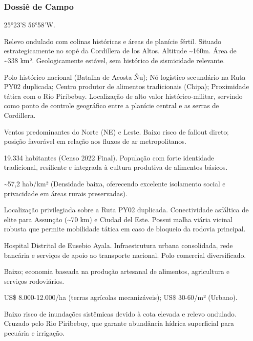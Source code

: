 \subsubsection{Dossiê de Campo}
\begin{description}[style=nextline,leftmargin=0.5cm,font=\bfseries]
\item[Coordenadas]  25°23'S 56°58'W.
\item[Topografia]  Relevo ondulado com colinas históricas e áreas de planície fértil. Situado estrategicamente no sopé da Cordillera de los Altos. Altitude \textasciitilde 160m. Área de \textasciitilde 338 km². Geologicamente estável, sem histórico de sismicidade relevante.
\item[Alvos Estratégicos]  Polo histórico nacional (Batalha de Acosta Ñu); Nó logístico secundário na Ruta PY02 duplicada; Centro produtor de alimentos tradicionais (Chipa); Proximidade tática com o Rio Piribebuy. Localização de alto valor histórico-militar, servindo como ponto de controle geográfico entre a planície central e as serras de Cordillera.
\item[Fallout]  Ventos predominantes do Norte (NE) e Leste. Baixo risco de fallout direto; posição favorável em relação aos fluxos de ar metropolitanos.
\item[População]  19.334 habitantes (Censo 2022 Final). População com forte identidade tradicional, resiliente e integrada à cultura produtiva de alimentos básicos.
\item[Densidade]  \textasciitilde 57,2 hab/\allowbreak km² (Densidade baixa, oferecendo excelente isolamento social e privacidade em áreas rurais preservadas).
\item[Vias de Acesso]  Localização privilegiada sobre a Ruta PY02 duplicada. Conectividade asfáltica de elite para Assunção (\textasciitilde 70 km) e Ciudad del Este. Possui malha viária vicinal robusta que permite mobilidade tática em caso de bloqueio da rodovia principal.
\item[Serviços]  Hospital Distrital de Eusebio Ayala. Infraestrutura urbana consolidada, rede bancária e serviços de apoio ao transporte nacional. Polo comercial diversificado.
\item[Custo de Vida]  Baixo; economia baseada na produção artesanal de alimentos, agricultura e serviços rodoviários.
\item[Preço da Terra]  US\$ 8.000-12.000/\allowbreak ha (terras agrícolas mecanizáveis); US\$ 30-60/\allowbreak m² (Urbano).
\item[Hidrologia]  Baixo risco de inundações sistêmicas devido à cota elevada e relevo ondulado. Cruzado pelo Rio Piribebuy, que garante abundância hídrica superficial para pecuária e irrigação.

\end{description}
